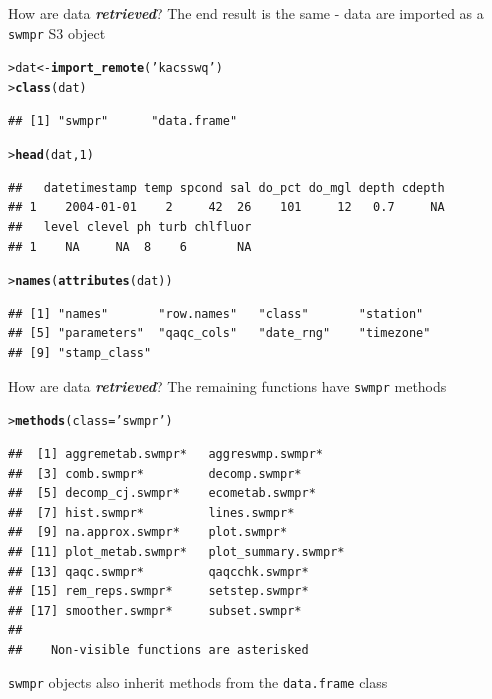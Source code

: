 \documentclass[serif]{beamer}\usepackage[]{graphicx}\usepackage[]{color}
\makeatletter
\newcommand{\hlnum}[1]{\textcolor[rgb]{0.686,0.059,0.569}{#1}}%
\newcommand{\hlstr}[1]{\textcolor[rgb]{0.192,0.494,0.8}{#1}}%
\newcommand{\hlstd}[1]{\textcolor[rgb]{0.345,0.345,0.345}{#1}}%
\newcommand{\hlkwb}[1]{\textcolor[rgb]{0.69,0.353,0.396}{#1}}%
\newcommand{\hlkwc}[1]{\textcolor[rgb]{0.333,0.667,0.333}{#1}}%
\newcommand{\hlkwd}[1]{\textcolor[rgb]{0.737,0.353,0.396}{\textbf{#1}}}%
\newenvironment{kframe}{%
 \def\at@end@of@kframe{}%
 \ifinner\ifhmode%
  \def\at@end@of@kframe{\end{minipage}}%
  \begin{minipage}{\columnwidth}%
 \fi\fi%
 \def\FrameCommand##1{\hskip\@totalleftmargin \hskip-\fboxsep
 \colorbox{shadecolor}{##1}\hskip-\fboxsep
     \hskip-\linewidth \hskip-\@totalleftmargin \hskip\columnwidth}%
 \MakeFramed {\advance\hsize-\width
   \@totalleftmargin\z@ \linewidth\hsize
   \@setminipage}}%
 {\par\unskip\endMakeFramed%
 \at@end@of@kframe}
\newenvironment{knitrout}{}{} %
\newcommand{\Bigtxt}[1]{\textbf{\textit{#1}}}
\makeatother
\begin{document}
\begin{frame}{How are data \Bigtxt{retrieved}?}
The end result is the same - data are imported as a \texttt{swmpr} S3 object
\begin{knitrout}\small
{}\color{fgcolor}\begin{kframe}
\begin{alltt}
\hlstd{> }\hlstd{dat} \hlkwb{<-} \hlkwd{import_remote}\hlstd{(}\hlstr{'kacsswq'}\hlstd{)}
\hlstd{> }\hlkwd{class}\hlstd{(dat)}
\end{alltt}
\begin{verbatim}
## [1] "swmpr"      "data.frame"
\end{verbatim}
\begin{alltt}
\hlstd{> }\hlkwd{head}\hlstd{(dat,} \hlnum{1}\hlstd{)}
\end{alltt}
\begin{verbatim}
##   datetimestamp temp spcond sal do_pct do_mgl depth cdepth
## 1    2004-01-01    2     42  26    101     12   0.7     NA
##   level clevel ph turb chlfluor
## 1    NA     NA  8    6       NA
\end{verbatim}
\begin{alltt}
\hlstd{> }\hlkwd{names}\hlstd{(}\hlkwd{attributes}\hlstd{(dat))}
\end{alltt}
\begin{verbatim}
## [1] "names"       "row.names"   "class"       "station"    
## [5] "parameters"  "qaqc_cols"   "date_rng"    "timezone"   
## [9] "stamp_class"
\end{verbatim}
\end{kframe}
\end{knitrout}
\end{frame}

\begin{frame}[fragile,t]{How are data \Bigtxt{retrieved}?}
The remaining functions have \texttt{swmpr} methods
\begin{knitrout}\small
{}\color{fgcolor}\begin{kframe}
\begin{alltt}
\hlstd{> }\hlkwd{methods}\hlstd{(}\hlkwc{class} \hlstd{=} \hlstr{'swmpr'}\hlstd{)}
\end{alltt}
\begin{verbatim}
##  [1] aggremetab.swmpr*   aggreswmp.swmpr*   
##  [3] comb.swmpr*         decomp.swmpr*      
##  [5] decomp_cj.swmpr*    ecometab.swmpr*    
##  [7] hist.swmpr*         lines.swmpr*       
##  [9] na.approx.swmpr*    plot.swmpr*        
## [11] plot_metab.swmpr*   plot_summary.swmpr*
## [13] qaqc.swmpr*         qaqcchk.swmpr*     
## [15] rem_reps.swmpr*     setstep.swmpr*     
## [17] smoother.swmpr*     subset.swmpr*      
## 
##    Non-visible functions are asterisked
\end{verbatim}
\end{kframe}
\end{knitrout}
\texttt{swmpr} objects also inherit methods from the \texttt{data.frame} class
\end{frame}
\end{document}
